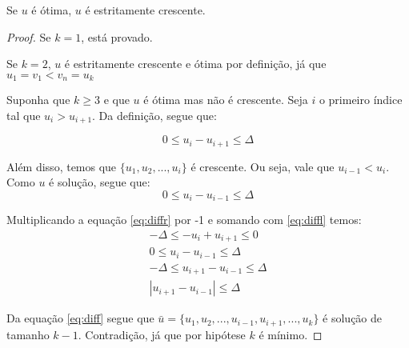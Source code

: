 \begin{prop} \label{salto:cres}
Se $u$ é ótima, $u$ é estritamente crescente.
\end{prop}
\begin{proof}

Se $k = 1$, está provado.

Se $k = 2$, $u$ é estritamente crescente e ótima por definição, já que $u_1 = v_1 < v_n = u_{k}$

Suponha que $k \geq 3$ e que $u$ é ótima mas não é crescente. Seja $i$ o primeiro índice tal que $u_{i} > u_{i + 1}$. Da definição, segue que:

\begin{equation} \label{eq:diffr}
0 \leq u_i - u_{i + 1} \leq \Delta
\end{equation}

Além disso, temos que $\{u_1, u_2, ..., u_i\}$ é crescente. Ou seja, vale que $u_{i - 1} < u_i$. Como $u$ é solução, segue que:
\begin{equation} \label{eq:diffl}
0 \leq u_i - u_{i - 1} \leq \Delta
\end{equation}

Multiplicando a equação \ref{eq:diffr} por -1 e somando com \ref{eq:diffl} temos:
\begin{align}  \label{eq:diff}
-\Delta \leq - u_i + u_{i + 1} \leq 0 \nonumber \\
0 \leq u_i - u_{i - 1} \leq \Delta \nonumber \\
-\Delta \leq u_{i + 1} - u_{i - 1} \leq \Delta \nonumber \\
|u_{i + 1} - u_{i - 1}| \leq \Delta
\end{align}

Da equação \ref{eq:diff} segue que $\bar{u} = \{u_1, u_2, ..., u_{i - 1}, u_{i + 1}, ..., u_k\}$ é solução de tamanho $k - 1$. Contradição, já que por hipótese $k$ é mínimo.

\end{proof}

